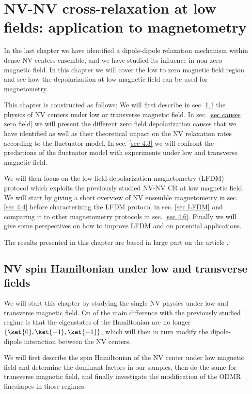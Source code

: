 \documentclass[a4paper,11pt]{report}
\title{}
\begin{document}
\chapter{NV-NV cross-relaxation at low fields: application to magnetometry}

In the last chapter we have identified a dipole-dipole relaxation mechanism within dense NV centers ensemble, and we have studied its influence in non-zero magnetic field. In this chapter we will cover the low to zero magnetic field region and see how the depolarization at low magnetic field can be used for magnetometry.

This chapter is constructed as follows: We will first describe in sec. \ref{sec 4.1} the physics of NV centers under low or transverse magnetic field. In sec. \ref{sec causes zero field}
we will present the different zero field depolarization causes that we have identified as well as their theoretical impact on the NV relaxation rates according to the fluctuator model. In sec. \ref{sec 4.3} we will confront the predictions of the fluctuator model with experiments under low and transverse magnetic field. 

We will then focus on the low field depolarization magnetometry (LFDM) protocol which exploits the previously studied NV-NV CR at low magnetic field. We will start by giving a short overview of NV ensemble magnetometry in sec. \ref{sec 4.4} before characterizing the LFDM protocol in sec. \ref{sec LFDM} and comparing it to other magnetometry protocols in sec. \ref{sec 4.6}. Finally we will give some perspectives on how to improve LFDM and on potential applications.

The results presented in this chapter are based in large part on the article \citep{pellet2022spin}.

\section{NV spin Hamiltonian under low and transverse fields}
\label{sec 4.1}
We will start this chapter by studying the single NV physics under low and transverse magnetic field. On of the main difference with the previously studied regime is that the eigenstates of the Hamiltonian are no longer $\{ \ket{0}, \ket{+1}, \ket{-1} \}$, which will then in turn modify the dipole-dipole interaction between the NV centers.

We will first describe the spin Hamiltonian of the NV center under low magnetic field and determine the dominant factors in our samples, then do the same for transverse magnetic field, and finally investigate the modification of the ODMR lineshapes in those regimes.
\end{document}

